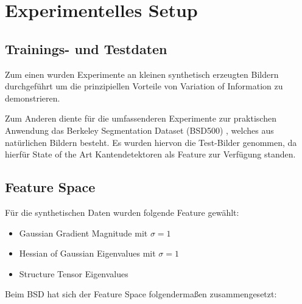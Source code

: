 \chapter{Experimentelles Setup}\label{ch:mathtest} %

\section{Trainings- und Testdaten}

Zum einen wurden Experimente an kleinen synthetisch erzeugten Bildern durchgeführt um die prinzipiellen Vorteile von Variation of Information zu demonstrieren. 

Zum Anderen diente für die umfassenderen Experimente zur praktischen Anwendung das Berkeley Segmentation Dataset (BSD500) \cite{BSD}, welches aus natürlichen Bildern besteht. Es wurden hiervon die Test-Bilder genommen, da hierfür State of the Art Kantendetektoren als Feature zur Verfügung standen.


\section{Feature Space}

Für die synthetischen Daten wurden folgende Feature gewählt:
\begin{itemize}
	\item Gaussian Gradient Magnitude mit $\sigma=1$
	\item Hessian of Gaussian Eigenvalues mit $\sigma=1$
	\item Structure Tensor Eigenvalues
\end{itemize}

Beim BSD hat sich der Feature Space folgendermaßen zusammengesetzt:

